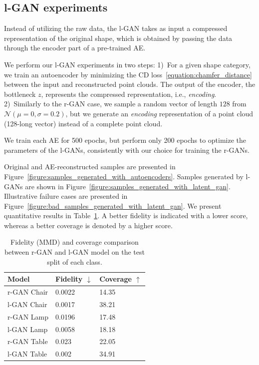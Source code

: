 \documentclass[12pt]{article}
\begin{document}
    \subsection{l-GAN experiments} Instead of utilizing the raw data, the l-GAN takes as input a compressed representation of the original shape, which is obtained by passing the data through the encoder part of a pre-trained AE.

    We perform our l-GAN experiments in two steps:
    1)~For a given shape category, we train an autoencoder by minimizing the CD loss~\eqref{equation:chamfer_distance} between the input and reconstructed point clouds. The output of the encoder, the bottleneck $z$, represents the compressed representation, i.e., \textit{encoding}.
    2)~Similarly to the r-GAN case, we sample a random vector of length $128$ from $\mathcal{N}(\mu=0,\sigma=0.2)$, but we generate an \textit{encoding} representation of a point cloud (128-long vector) instead of a complete point cloud.

    We train each AE for 500 epochs, but perform only 200 epochs to optimize the parameters of the l-GANs, consistently with our choice for training the r-GANs.

    Original and AE-reconstructed samples are presented in Figure~\ref{figure:samples_generated_with_autoencoders}. Samples generated by l-GANs are shown in Figure~\ref{figure:samples_generated_with_latent_gan}. Illustrative failure cases are presented in Figure~\ref{figure:bad_samples_generated_with_latent_gan}. We present quantitative results in Table~\ref{table:results}. A better fidelity is indicated with a lower score, whereas a better coverage is denoted by a higher score.

    \begin{table}[H]
        \centering
        \caption{Fidelity (MMD) and coverage comparison between r-GAN and l-GAN model on the test split of each class. }
        \begin{tabular}{lll}
            \toprule
            Model       & Fidelity $\downarrow$ & Coverage $\uparrow$ \\
            \midrule
            r-GAN Chair & 0.0022                & 14.35               \\
            l-GAN Chair & 0.0017                & 38.21               \\
            \midrule
            r-GAN Lamp  & 0.0196                & 17.48               \\
            l-GAN Lamp  & 0.0058                & 18.18               \\
            \midrule
            r-GAN Table & 0.023                 & 22.05               \\
            l-GAN Table & 0.002                 & 34.91               \\
            \bottomrule
        \end{tabular}
        \label{table:results}
    \end{table}
\end{document}
